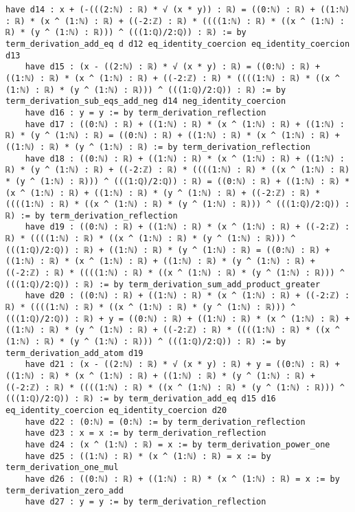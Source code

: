 \documentclass{article}
\begin{document}
\begin{tcolorbox}[colback=white!10, width=\linewidth]
\begin{lstlisting}[language=Lean4]
    have d14 : x + (-(((2:ℕ) : ℝ) * √ (x * y)) : ℝ) = ((0:ℕ) : ℝ) + ((1:ℕ) : ℝ) * (x ^ (1:ℕ) : ℝ) + ((-2:ℤ) : ℝ) * ((((1:ℕ) : ℝ) * ((x ^ (1:ℕ) : ℝ) * (y ^ (1:ℕ) : ℝ))) ^ (((1:ℚ)/2:ℚ)) : ℝ) := by term_derivation_add_eq d d12 eq_identity_coercion eq_identity_coercion d13
    have d15 : (x - ((2:ℕ) : ℝ) * √ (x * y) : ℝ) = ((0:ℕ) : ℝ) + ((1:ℕ) : ℝ) * (x ^ (1:ℕ) : ℝ) + ((-2:ℤ) : ℝ) * ((((1:ℕ) : ℝ) * ((x ^ (1:ℕ) : ℝ) * (y ^ (1:ℕ) : ℝ))) ^ (((1:ℚ)/2:ℚ)) : ℝ) := by term_derivation_sub_eqs_add_neg d14 neg_identity_coercion
    have d16 : y = y := by term_derivation_reflection
    have d17 : ((0:ℕ) : ℝ) + ((1:ℕ) : ℝ) * (x ^ (1:ℕ) : ℝ) + ((1:ℕ) : ℝ) * (y ^ (1:ℕ) : ℝ) = ((0:ℕ) : ℝ) + ((1:ℕ) : ℝ) * (x ^ (1:ℕ) : ℝ) + ((1:ℕ) : ℝ) * (y ^ (1:ℕ) : ℝ) := by term_derivation_reflection
    have d18 : ((0:ℕ) : ℝ) + ((1:ℕ) : ℝ) * (x ^ (1:ℕ) : ℝ) + ((1:ℕ) : ℝ) * (y ^ (1:ℕ) : ℝ) + ((-2:ℤ) : ℝ) * ((((1:ℕ) : ℝ) * ((x ^ (1:ℕ) : ℝ) * (y ^ (1:ℕ) : ℝ))) ^ (((1:ℚ)/2:ℚ)) : ℝ) = ((0:ℕ) : ℝ) + ((1:ℕ) : ℝ) * (x ^ (1:ℕ) : ℝ) + ((1:ℕ) : ℝ) * (y ^ (1:ℕ) : ℝ) + ((-2:ℤ) : ℝ) * ((((1:ℕ) : ℝ) * ((x ^ (1:ℕ) : ℝ) * (y ^ (1:ℕ) : ℝ))) ^ (((1:ℚ)/2:ℚ)) : ℝ) := by term_derivation_reflection
    have d19 : ((0:ℕ) : ℝ) + ((1:ℕ) : ℝ) * (x ^ (1:ℕ) : ℝ) + ((-2:ℤ) : ℝ) * ((((1:ℕ) : ℝ) * ((x ^ (1:ℕ) : ℝ) * (y ^ (1:ℕ) : ℝ))) ^ (((1:ℚ)/2:ℚ)) : ℝ) + ((1:ℕ) : ℝ) * (y ^ (1:ℕ) : ℝ) = ((0:ℕ) : ℝ) + ((1:ℕ) : ℝ) * (x ^ (1:ℕ) : ℝ) + ((1:ℕ) : ℝ) * (y ^ (1:ℕ) : ℝ) + ((-2:ℤ) : ℝ) * ((((1:ℕ) : ℝ) * ((x ^ (1:ℕ) : ℝ) * (y ^ (1:ℕ) : ℝ))) ^ (((1:ℚ)/2:ℚ)) : ℝ) := by term_derivation_sum_add_product_greater
    have d20 : ((0:ℕ) : ℝ) + ((1:ℕ) : ℝ) * (x ^ (1:ℕ) : ℝ) + ((-2:ℤ) : ℝ) * ((((1:ℕ) : ℝ) * ((x ^ (1:ℕ) : ℝ) * (y ^ (1:ℕ) : ℝ))) ^ (((1:ℚ)/2:ℚ)) : ℝ) + y = ((0:ℕ) : ℝ) + ((1:ℕ) : ℝ) * (x ^ (1:ℕ) : ℝ) + ((1:ℕ) : ℝ) * (y ^ (1:ℕ) : ℝ) + ((-2:ℤ) : ℝ) * ((((1:ℕ) : ℝ) * ((x ^ (1:ℕ) : ℝ) * (y ^ (1:ℕ) : ℝ))) ^ (((1:ℚ)/2:ℚ)) : ℝ) := by term_derivation_add_atom d19
    have d21 : (x - ((2:ℕ) : ℝ) * √ (x * y) : ℝ) + y = ((0:ℕ) : ℝ) + ((1:ℕ) : ℝ) * (x ^ (1:ℕ) : ℝ) + ((1:ℕ) : ℝ) * (y ^ (1:ℕ) : ℝ) + ((-2:ℤ) : ℝ) * ((((1:ℕ) : ℝ) * ((x ^ (1:ℕ) : ℝ) * (y ^ (1:ℕ) : ℝ))) ^ (((1:ℚ)/2:ℚ)) : ℝ) := by term_derivation_add_eq d15 d16 eq_identity_coercion eq_identity_coercion d20
    have d22 : (0:ℕ) = (0:ℕ) := by term_derivation_reflection
    have d23 : x = x := by term_derivation_reflection
    have d24 : (x ^ (1:ℕ) : ℝ) = x := by term_derivation_power_one
    have d25 : ((1:ℕ) : ℝ) * (x ^ (1:ℕ) : ℝ) = x := by term_derivation_one_mul
    have d26 : ((0:ℕ) : ℝ) + ((1:ℕ) : ℝ) * (x ^ (1:ℕ) : ℝ) = x := by term_derivation_zero_add
    have d27 : y = y := by term_derivation_reflection

\end{lstlisting}
\end{tcolorbox}
\end{document}
